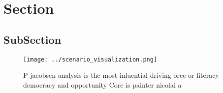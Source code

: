 \documentclass[a4paper]{article}
\begin{document}
\section{Section}

\subsection{SubSection}

\begin{figure}
\centering
\texttt{[image: ../scenario\_visualization.png]}
\caption{P jacobsen analysis is the most inluential driving orce or literacy democracy and opportunity Core is painter nicolai a
}
\end{figure}
 
\end{document}
